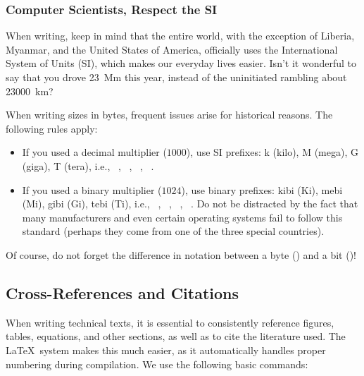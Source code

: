 \documentclass[9pt]{style/friteza}
\begin{document}
\subsubsection{Computer Scientists, Respect the SI}
When writing, keep in mind that the entire world, with the exception of Liberia, Myanmar, and the United States of America, officially uses the International System of Units (SI), which makes our everyday lives easier. Isn't it wonderful to say that you drove \qty{23}{\mega\meter} this year, instead of the uninitiated rambling about \qty{23000}{\kilo\meter}?

When writing sizes in bytes, frequent issues arise for historical reasons. The following rules apply:
\begin{itemize}
\item If you used a decimal multiplier ($1000$), use SI prefixes: k (kilo), M (mega), G (giga), T (tera), i.e., \unit{\kilo\byte}, \unit{\mega\byte}, \unit{\giga\byte}, \unit{\tera\byte}.
\item If you used a binary multiplier ($1024$), use binary prefixes: 
kibi (\unit{Ki}), mebi (\unit{Mi}), gibi (\unit{Gi}), tebi (\unit{Ti}), 
i.e., \unit{\kibi\byte}, \unit{\mebi\byte}, \unit{\gibi\byte}, \unit{\tebi\byte}. 
Do not be distracted by the fact that many manufacturers and even certain operating 
systems fail to follow this standard (perhaps they come from one of the three special countries).
\end{itemize}

Of course, do not forget the difference in notation between a byte (\unit{\byte}) and a bit (\unit{\bit})!

\subsection{Cross-References and Citations}

When writing technical texts, it is essential to consistently reference figures, tables, equations, and other sections, as well as to cite the literature used. The \LaTeX\ system makes this much easier, as it automatically handles proper numbering during compilation. We use the following basic commands:
\end{document}
